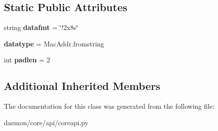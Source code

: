 \subsection*{Static Public Attributes}
\begin{DoxyCompactItemize}
\item 
\hypertarget{classcore_1_1api_1_1coreapi_1_1_core_tlv_data_mac_addr_aa9e1e9f293f84cda0abe793f9f429aac}{string {\bfseries datafmt} = \char`\"{}!2x8s\char`\"{}}\label{classcore_1_1api_1_1coreapi_1_1_core_tlv_data_mac_addr_aa9e1e9f293f84cda0abe793f9f429aac}

\item 
\hypertarget{classcore_1_1api_1_1coreapi_1_1_core_tlv_data_mac_addr_afcdc2960a5a439cea1f0f383a8a7ac2c}{{\bfseries datatype} = Mac\+Addr.\+fromstring}\label{classcore_1_1api_1_1coreapi_1_1_core_tlv_data_mac_addr_afcdc2960a5a439cea1f0f383a8a7ac2c}

\item 
\hypertarget{classcore_1_1api_1_1coreapi_1_1_core_tlv_data_mac_addr_afc09fb6b2c796eca3051ed62ee98eb9e}{int {\bfseries padlen} = 2}\label{classcore_1_1api_1_1coreapi_1_1_core_tlv_data_mac_addr_afc09fb6b2c796eca3051ed62ee98eb9e}

\end{DoxyCompactItemize}
\subsection*{Additional Inherited Members}


The documentation for this class was generated from the following file\+:\begin{DoxyCompactItemize}
\item 
daemon/core/api/coreapi.\+py\end{DoxyCompactItemize}
